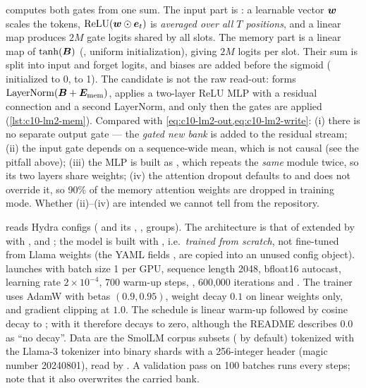 \begin{implnote}[title={In the code: the gates differ from the equations}]
 computes both gates from one sum. The input part is
: a learnable vector $\bm{w}$ scales the tokens, $\operatorname{ReLU}(\bm{w} \odot \bm{e}_t)$ is
\emph{averaged over all $T$ positions}, and a linear map produces $2M$ gate logits shared by all
slots. The memory part is a linear map of $\tanh(\bm{B})$ (, uniform
initialization), giving $2M$ logits per slot. Their sum is split into input and forget logits, and
biases are added before the sigmoid ( initialized to 0,  to 1).
The candidate is not the raw read-out:  forms
$\operatorname{LayerNorm}(\bm{B} + \bm{E}_{\mathrm{mem}})$, applies a two-layer ReLU MLP with a residual connection
and a second LayerNorm, and only then the gates are applied
(\cref{lst:c10-lm2-mem}). Compared with \cref{eq:c10-lm2-out,eq:c10-lm2-write}: (i) there is no
separate output gate --- the \emph{gated new bank} is added to the residual stream; (ii) the input
gate depends on a sequence-wide mean, which is not causal (see the pitfall above); (iii) the MLP is
built as , which repeats the \emph{same} module twice,
so its two layers share weights; (iv) the attention dropout defaults to  and
 does not override it, so 90\% of the memory attention weights are dropped
in training mode. Whether (ii)--(iv) are intended we cannot tell from the repository.
\end{implnote}

\begin{implnote}[title={In the code: training setup}]
 reads Hydra configs ( and
its , ,  groups). The architecture is that of
 extended by 
with ,  and ; the model is built with
, i.e.\ \emph{trained from scratch}, not fine-tuned from Llama weights
(the YAML fields ,  are copied into an unused config object).
 launches  with batch size 1 per GPU, sequence length 2048,
bfloat16 autocast, learning rate $2\times10^{-4}$, 700 warm-up steps, ,
600{,}000 iterations and . The trainer uses AdamW with betas
$(0.9, 0.95)$, weight decay $0.1$ on linear weights only, and gradient clipping at $1.0$. The
schedule is linear warm-up followed by cosine decay to
; with  it therefore decays to zero,
although the README describes $0.0$ as ``no decay''. Data are the SmolLM corpus subsets
( by default) tokenized with the Llama-3 tokenizer into binary shards with a
256-integer header (magic number 20240801), read by . A validation
pass on 100 batches runs every  steps; note that it also overwrites the carried
bank.
\end{implnote}

